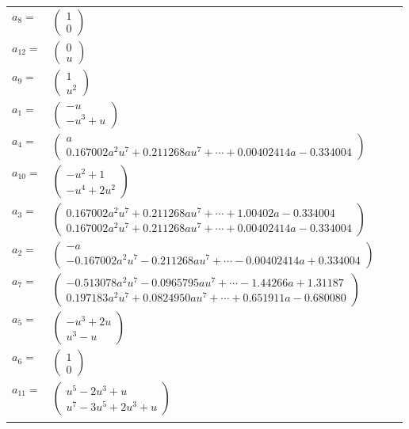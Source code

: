 \documentclass[1p]{elsarticle_modified}
\theoremstyle{definition}
\begin{document}
\begin{tabular}{m{7pt} m{180pt} m{7pt} m{180pt} }
\flushright $a_{8}=$&$\begin{pmatrix}1\\0\end{pmatrix}$ \\
\flushright $a_{12}=$&$\begin{pmatrix}0\\u\end{pmatrix}$ \\
\flushright $a_{9}=$&$\begin{pmatrix}1\\u^2\end{pmatrix}$ \\
\flushright $a_{1}=$&$\begin{pmatrix}- u\\- u^3+u\end{pmatrix}$ \\
\flushright $a_{4}=$&$\begin{pmatrix}a\\0.167002 a^{2} u^{7}+0.211268 a u^{7}+\cdots+0.00402414 a-0.334004\end{pmatrix}$ \\
\flushright $a_{10}=$&$\begin{pmatrix}- u^2+1\\- u^4+2 u^2\end{pmatrix}$ \\
\flushright $a_{3}=$&$\begin{pmatrix}0.167002 a^{2} u^{7}+0.211268 a u^{7}+\cdots+1.00402 a-0.334004\\0.167002 a^{2} u^{7}+0.211268 a u^{7}+\cdots+0.00402414 a-0.334004\end{pmatrix}$ \\
\flushright $a_{2}=$&$\begin{pmatrix}- a\\-0.167002 a^{2} u^{7}-0.211268 a u^{7}+\cdots-0.00402414 a+0.334004\end{pmatrix}$ \\
\flushright $a_{7}=$&$\begin{pmatrix}-0.513078 a^{2} u^{7}-0.0965795 a u^{7}+\cdots-1.44266 a+1.31187\\0.197183 a^{2} u^{7}+0.0824950 a u^{7}+\cdots+0.651911 a-0.680080\end{pmatrix}$ \\
\flushright $a_{5}=$&$\begin{pmatrix}- u^3+2 u\\u^3- u\end{pmatrix}$ \\
\flushright $a_{6}=$&$\begin{pmatrix}1\\0\end{pmatrix}$ \\
\flushright $a_{11}=$&$\begin{pmatrix}u^5-2 u^3+u\\u^7-3 u^5+2 u^3+u\end{pmatrix}$\\&\end{tabular}
\end{document}
